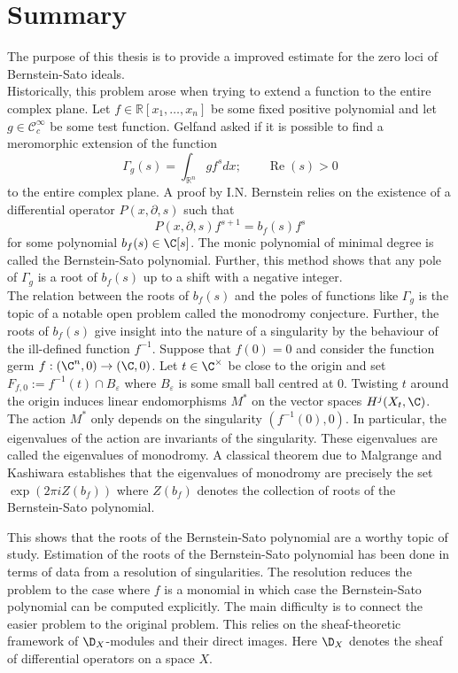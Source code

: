 \chapter*{Summary}\label{ch: Summary} %



The purpose of this thesis is to provide a improved estimate for the zero loci of Bernstein-Sato ideals.\\

Historically, this problem arose when trying to extend a function to the entire complex plane.
Let $f\in \mathbb{R}[x_1,\ldots,x_n]$ be some fixed positive polynomial and let $g \in \mathcal{C}_c^\infty$ be some test function.
Gelfand asked if it is possible to find a meromorphic extension of the function
$$\Gamma_g(s) = \int_{\mathbb{R}^n} g f^s dx; \qquad \operatorname{Re}(s)>0 $$
to the entire complex plane.
A proof by I.N. Bernstein relies on the existence of a differential operator $P(x,\partial, s)$ such that
$$P(x,\partial,s) f^{s+1} = b_f(s) f^s$$
for some polynomial $b_f(s)\in \C[s]$.
The monic polynomial of minimal degree is called the Bernstein-Sato polynomial.
Further, this method shows that any pole of $\Gamma_g$ is a root of $b_f(s)$ up to a shift with a negative integer.\\

The relation between the roots of $b_f(s)$ and the poles of functions like $\Gamma_g$ is the topic of a notable open problem called the monodromy conjecture.
Further, the roots of $b_f(s)$ give insight into the nature of a singularity by the behaviour of the ill-defined function $f^{-1}$.
Suppose that $f(0)= 0$ and consider the function germ $f:(\C^n,0)\to (\C,0)$.
Let $t\in \C^\times$ be close to the origin and set $F_{f,0} := f^{-1}(t)\cap B_\varepsilon$ where $B_\varepsilon$ is some small ball centred at $0$.
Twisting $t$ around the origin induces linear endomorphisms $M^*$ on the vector spaces $H^j(X_t,\C)$.
The action $M^*$ only depends on the singularity $(f^{-1}(0),0)$.
In particular, the eigenvalues of the action are invariants of the singularity.
These eigenvalues are called the eigenvalues of monodromy.
A classical theorem due to Malgrange and Kashiwara establishes that the eigenvalues of monodromy are precisely the set $\exp(2\pi i Z(b_f))$ where $Z(b_f)$ denotes the collection of roots of the Bernstein-Sato polynomial.

This shows that the roots of the Bernstein-Sato polynomial are a worthy topic of study.
Estimation of the roots of the Bernstein-Sato polynomial has been done in terms of data from a resolution of singularities.
The resolution reduces the problem to the case where $f$ is a monomial in which case the Bernstein-Sato polynomial can be computed explicitly.
The main difficulty is to connect the easier problem to the original problem.
This relies on the sheaf-theoretic framework of $\D_X$-modules and their direct images.
Here $\D_X$ denotes the sheaf of differential operators on a space $X$.

